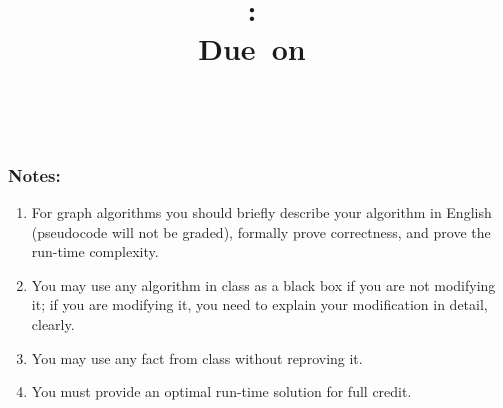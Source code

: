 \documentclass{article}
\title{
    \vspace{2in}
    \textmd{\textbf{\hmwkClass:\ \hmwkTitle}}\\
    \normalsize\vspace{0.1in}\small{Due\ on\ \hmwkDueDate}\\
    \vspace{0.1in}\large{\textit{\hmwkClassInstructor\ \hmwkClassTime}}
    \vspace{3in}
}
\author{\hmwkAuthorName}
\date{}
\begin{document}
\maketitle
\pagebreak

\subsubsection*{Notes:}
\begin{enumerate}[label=\textbf{\alph*.)}]
\item For graph algorithms you should briefly describe your algorithm in English (pseudocode will not be graded), formally prove correctness, and prove the run-time complexity.
\item You may use any algorithm in class as a black box if you are not modifying it; if you are modifying it, you need to explain your modification in detail, clearly.
\item You may use any fact from class without reproving it.
\item You must provide an optimal run-time solution for full credit.
\end{enumerate}
\pagebreak
\end{document}
